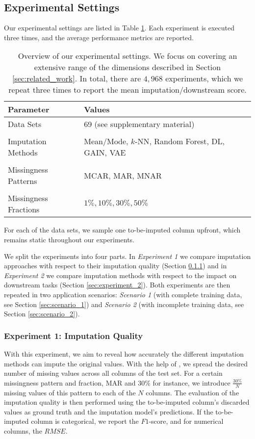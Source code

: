 \subsection{Experimental Settings}
%
Our experimental settings are listed in Table \ref{tab:experiment_settings}. Each experiment is executed three times, and the average performance metrics are reported.
%
\begin{table}
	\centering
	\begin{tabular}{ll}
		\toprule
		Parameter            & Values                                     \\ \midrule
		Data Sets             & 69 (see supplementary material)    \\
		\\[-0.5em]
		Imputation Methods              & Mean/Mode, $k$-NN, Random Forest, DL, GAIN, VAE \\
		\\[-0.5em]
		Missingness Patterns  & MCAR, MAR, MNAR                            \\
		\\[-0.5em]
		Missingness Fractions & $1\%, 10\%, 30\%, 50\%$                      \\ \bottomrule
	\end{tabular}
	\caption{Overview of our experimental settings. We focus on covering an extensive range of the dimensions described in Section \ref{sec:related_work}. In total, there are $4,968$ experiments, which we repeat three times to report the mean imputation/downstream score.}
	\label{tab:experiment_settings}
\end{table}
%
For each of the data sets, we sample one to-be-imputed column upfront, which remains static throughout our experiments.

We split the experiments into four parts. In \emph{Experiment 1} we compare imputation approaches with respect to their imputation quality (Section \ref{sec:experiment_1}) and in \emph{Experiment 2} we compare imputation methods with respect to the impact on downstream tasks (Section \ref{sec:experiment_2}). Both experiments are then repeated in two application scenarios: \emph{Scenario 1} (with complete training data, see Section \ref{sec:scenario_1}) and \emph{Scenario 2} (with incomplete training data, see Section \ref{sec:scenario_2}).

\subsubsection{Experiment 1: Imputation Quality}
\label{sec:experiment_1}
%
With this experiment, we aim to reveal how accurately the different imputation methods can impute the original values.
With the help of , we spread the desired number of missing values across all columns of the test set. For a certain missingness pattern and fraction, MAR and $30\%$ for instance, we introduce $\frac{30\%}{N}$ missing values of this pattern to each of the $N$ columns.
The evaluation of the imputation quality is then performed using the to-be-imputed column's discarded values as ground truth and the imputation model's predictions. If the to-be-imputed column is categorical, we report the $F1$-score, and for numerical columns, the $RMSE$.


